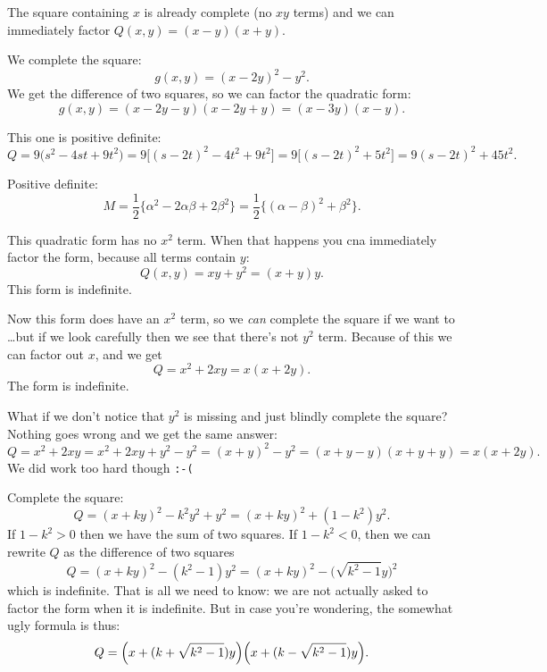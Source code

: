 \item[{\bfseries(III5.5b)}]

The square containing $x$ is already complete (no $xy$ terms) and we can immediately
factor $Q(x, y) = (x-y)(x+y)$.
\bigskip

\item[{\bfseries(III5.5c)}]

We complete the square:
\[
  g(x, y) = (x-2y)^2 - y^2.
\]
We get the difference of two squares, so we can factor the quadratic form:
\[
  g(x, y) = (x-2y - y) (x-2y + y) = (x-3y)(x-y).
\]
\bigskip

\item[{\bfseries(III5.5d)}]

This one is positive definite:
\[
  Q
  = 9\bigl( s^2 - 4st + 9 t^2\bigr)
  = 9\bigl[ (s - 2t)^2 -4t^2 + 9 t^2\bigr]
  = 9\bigl[ (s - 2t)^2 + 5 t^2\bigr]
  =9(s-2t)^2 + 45 t^2.
\]
\bigskip

\item[{\bfseries(III5.5e)}]

Positive definite:
\[
  M = \frac12\bigl\{\alpha^2- 2\alpha\beta + 2\beta^2\bigr\}
  =\frac12 \bigl\{(\alpha-\beta)^2 + \beta^2\bigr\}.
\]
\bigskip

\item[{\bfseries(III5.5f)}]

This quadratic form has no $x^2$ term.  When that happens you cna immediately factor
the form, because all terms contain $y$:
\[
Q(x,y) = xy+y^2 = (x+y)y.
\]
This form is indefinite.
\bigskip

\item[{\bfseries(III5.5g)}]

Now this form does have an $x^2$ term, so we \textit{can} complete the square if we
want to \dots but if we look carefully then we see that there's not $y^2$ term.
Because of this we can factor out $x$, and we get
\[
  Q = x^2+2xy = x(x+2y).
\]
The form is indefinite.

What if we don't notice that $y^2$ is missing and just blindly complete the square?
Nothing goes wrong and we get the same answer:
\[
  Q = x^2+2xy = x^2+ 2xy +y^2 - y^2 = (x+y)^2 - y^2 = (x+y - y)(x+y+y) = x(x+2y).
\]
We did work too hard though \verb|:-(|
\bigskip

\item[{\bfseries(III5.6)}]

Complete the square:
\[
  Q=(x+ky)^2 - k^2 y^2 + y^2
   =(x+ky)^2 + (1- k^2) y^2.
\]
If $1-k^2>0$ then we have the sum of two squares.  If $1-k^2<0$, then we can rewrite
$Q$ as the difference of two squares
\[
   Q=(x+ky)^2 - (k^2-1) y^2
   =(x+ky)^2 - \bigl(\sqrt{k^2-1}y\bigr)^2
\]
which is indefinite.  That is all we need to know: we are not actually asked to
factor the form when it is indefinite.  But in case you're wondering, the somewhat
ugly formula is thus:
\[
  Q = \Bigl(x+(k+\sqrt{k^2-1}) y\Bigr) \Bigl(x+(k-\sqrt{k^2-1}) y\Bigr).
\]

